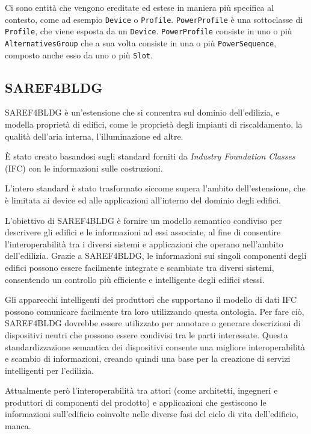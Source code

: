 Ci sono entità che vengono ereditate ed estese in maniera più specifica al
contesto, come ad esempio \texttt{Device} o \texttt{Profile}.
\texttt{PowerProfile} è una sottoclasse di \texttt{Profile}, che viene esposta
da un \texttt{Device}. \texttt{PowerProfile} consiste in uno o più
\texttt{AlternativesGroup} che a sua volta consiste in una o più
\texttt{PowerSequence}, composto anche esso da uno o più \texttt{Slot}.

\subsection{SAREF4BLDG}
SAREF4BLDG è un'estensione che si concentra sul dominio dell'edilizia,
e modella proprietà di edifici, come le proprietà degli impianti di
riscaldamento, la qualità dell'aria interna, l'illuminazione ed altre.

È stato creato basandosi sugli standard forniti da \textit{Industry Foundation
      Classes} (IFC) con le informazioni sulle costruzioni.

L'intero standard è stato trasformato siccome supera l'ambito dell'estensione,
che è limitata ai device ed alle applicazioni all'interno del dominio degli
edifici.

L'obiettivo di SAREF4BLDG è fornire un modello semantico condiviso per
descrivere gli edifici e le informazioni ad essi associate, al fine di
consentire l'interoperabilità tra i diversi sistemi e applicazioni che operano
nell'ambito dell'edilizia. Grazie a SAREF4BLDG, le informazioni sui singoli
componenti degli edifici possono essere facilmente integrate e scambiate tra
diversi sistemi, consentendo un controllo più efficiente e intelligente degli
edifici stessi.

Gli apparecchi intelligenti dei produttori che supportano il modello di dati
IFC possono comunicare facilmente tra loro utilizzando questa ontologia. Per
fare ciò, SAREF4BLDG dovrebbe essere utilizzato per annotare o generare
descrizioni di dispositivi neutri che possono essere condivisi tra le parti
interessate. Questa standardizzazione semantica dei dispositivi consente una
migliore interoperabilità e scambio di informazioni, creando quindi una base
per la creazione di servizi intelligenti per l'edilizia.

Attualmente però l'interoperabilità tra attori (come architetti, ingegneri e
produttori di componenti del prodotto) e applicazioni che gestiscono le
informazioni sull'edificio coinvolte nelle diverse fasi del ciclo di vita
dell'edificio, manca.

